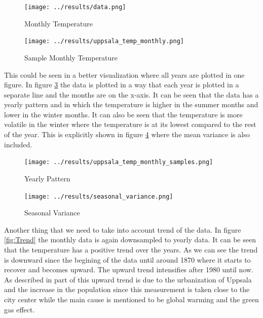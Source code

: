 \documentclass{IEEEtran}
\begin{document}
    \begin{figure}
      \begin{center}
        \texttt{[image: ../results/data.png]}
      \end{center}
      \caption{Monthly Temperature}\label{fig:UppsalaTemperature}
    \end{figure}
    
    \begin{figure}[h!]
      \centering
      \captionsetup{justification=centering}
      \texttt{[image: ../results/uppsala\_temp\_monthly.png]}
      \caption{Sample Monthly Temperature}
      \label{fig:UppsalaTemperatureSliced}
    \end{figure}

    This could be seen in a better visualization where all years are plotted in one figure. In figure \ref{fig:UppsalaTemperatureByMonth} the data is plotted in a way that each year is plotted in a separate line and the months are on the x-axis. It can be seen that the data has a yearly pattern and in which the temperature is higher in the summer months and lower in the winter months. It can also be seen that the temperature is more volatile in the winter where the temperature is at its lowest compared to the rest of the year. This is explicitly shown in figure \ref{fig:SeasonalVariance} where the mean variance is also included.
    \begin{figure}[h!]
      \centering
      \captionsetup{justification=centering}
      \texttt{[image: ../results/uppsala\_temp\_monthly\_samples.png]}
      \caption{Yearly Pattern}
      \label{fig:UppsalaTemperatureByMonth}
    \end{figure}
    \begin{figure}[h!]
      \centering
      \captionsetup{justification=centering}
      \texttt{[image: ../results/seasonal\_variance.png]}
      \caption{Seasonal Variance}
      \label{fig:SeasonalVariance}
    \end{figure}

    Another thing that we need to take into account trend of the data. In figure \ref{fig:Trend} the monthly data is again downsampled to yearly data. It can be seen that the temperature has a positive trend over the years. As we can see the trend is downward since the begining of the data until around 1870 where it starts to recover and becomes upward. The upward trend intensifies after 1980 until now. As described in \cite{BergstromHans2002Data}  part of this upward trend is due to the urbanization of Uppsala and the increase in the population since this measurement is taken close to the city center while the main cause is mentioned to be global warming and the green gas effect.
    
\end{document}
